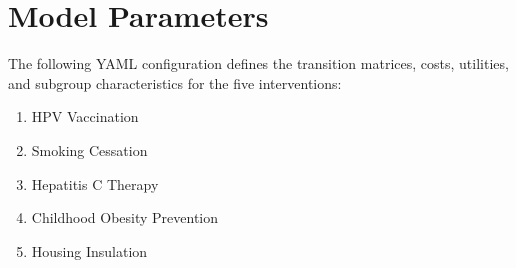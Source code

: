 \documentclass{article}
\author{Dylan A. Mordaunt\\Victoria University of Wellington}
\newcommand{\myabstract}{}
\begin{document}
\maketitle
\begin{abstract}
\myabstract
\end{abstract}

\section{Model Parameters}

The following YAML configuration defines the transition matrices, costs, utilities, and subgroup characteristics for the five interventions:
\begin{enumerate}
    \item HPV Vaccination
    \item Smoking Cessation
    \item Hepatitis C Therapy
    \item Childhood Obesity Prevention
    \item Housing Insulation
\end{enumerate}
\end{document}
